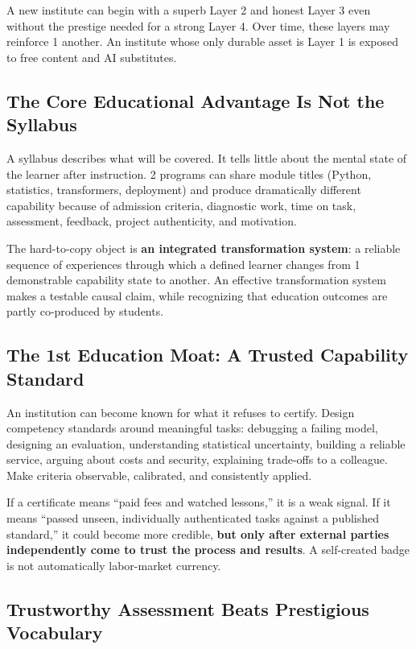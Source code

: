 A new institute can begin with a superb Layer 2 and honest Layer 3 even without the prestige needed for a strong Layer 4. Over time, these layers may reinforce 1 another. An institute whose only durable asset is Layer 1 is exposed to free content and AI substitutes.

\subsection{The Core Educational Advantage Is Not the Syllabus}
\label{sec:core_educational_advantage_not_syllabus}

A syllabus describes what will be covered. It tells little about the mental state of the learner after instruction. 2 programs can share module titles (Python, statistics, transformers, deployment) and produce dramatically different capability because of admission criteria, diagnostic work, time on task, assessment, feedback, project authenticity, and motivation.

The hard-to-copy object is \textbf{an integrated transformation system}: a reliable sequence of experiences through which a defined learner changes from 1 demonstrable capability state to another. An effective transformation system makes a testable causal claim, while recognizing that education outcomes are partly co-produced by students.

\subsection{The 1st Education Moat: A Trusted Capability Standard}
\label{sec:first_education_moat_capability_standard}

An institution can become known for what it refuses to certify. Design competency standards around meaningful tasks: debugging a failing model, designing an evaluation, understanding statistical uncertainty, building a reliable service, arguing about costs and security, explaining trade-offs to a colleague. Make criteria observable, calibrated, and consistently applied.

If a certificate means ``paid fees and watched lessons,'' it is a weak signal. If it means ``passed unseen, individually authenticated tasks against a published standard,'' it could become more credible, \textbf{but only after external parties independently come to trust the process and results}. A self-created badge is not automatically labor-market currency.

\subsection{Trustworthy Assessment Beats Prestigious Vocabulary}
\label{sec:trustworthy_assessment_beats_prestige_language}

